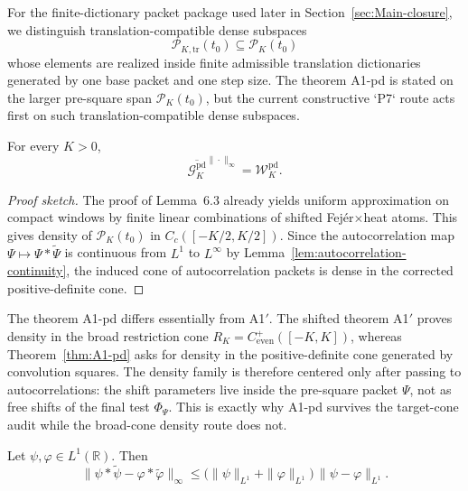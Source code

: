 \begin{remark}\label{rem:packet-translation-subspace}
For the finite-dictionary packet package used later in Section~\ref{sec:Main-closure},
we distinguish translation-compatible dense subspaces
\[
  \mathcal P_{K,\mathrm{tr}}(t_0)\subseteq \mathcal P_K(t_0)
\]
whose elements are realized inside finite admissible translation dictionaries
generated by one base packet and one step size. The theorem A1-pd is stated on
the larger pre-square span $\mathcal P_K(t_0)$, but the current constructive
`P7` route acts first on such translation-compatible dense subspaces.
\end{remark}

\begin{theorem}\label{thm:A1-pd}
For every $K>0$,
\[
  \overline{\mathcal G_K^{\mathrm{pd}}}^{\|\cdot\|_\infty}
  =
  \mathcal W_K^{\mathrm{pd}}.
\]
\end{theorem}
\begin{proof}[Proof sketch]
The proof of Lemma~6.3 already yields uniform approximation on compact windows by
finite linear combinations of shifted Fej\'er$\times$heat atoms. This gives
density of $\mathcal P_K(t_0)$ in $C_c([-K/2,K/2])$. Since the autocorrelation map
$\Psi\mapsto \Psi * \widetilde{\Psi}$ is continuous from $L^1$ to $L^\infty$ by
Lemma~\ref{lem:autocorrelation-continuity}, the induced cone of autocorrelation
packets is dense in the corrected positive-definite cone.
\end{proof}

\begin{remark}\label{rem:A1-pd-right-target}
The theorem A1-pd differs essentially from A1$'$. The shifted theorem A1$'$ proves
density in the broad restriction cone $R_K=C^+_{\mathrm{even}}([-K,K])$, whereas
Theorem~\ref{thm:A1-pd} asks for density in the positive-definite cone generated by
convolution squares. The density family is therefore centered only after passing to
autocorrelations: the shift parameters live inside the pre-square packet $\Psi$, not
as free shifts of the final test $\Phi_\Psi$. This is exactly why A1-pd survives the
target-cone audit while the broad-cone density route does not.
\end{remark}

\begin{lemma}\label{lem:autocorrelation-continuity}
Let $\psi,\varphi\in L^1(\mathbb R)$. Then
\[
  \|\psi*\widetilde{\psi}-\varphi*\widetilde{\varphi}\|_\infty
  \le
  \bigl(\|\psi\|_{L^1}+\|\varphi\|_{L^1}\bigr)\,\|\psi-\varphi\|_{L^1}.
\]
\end{lemma}

